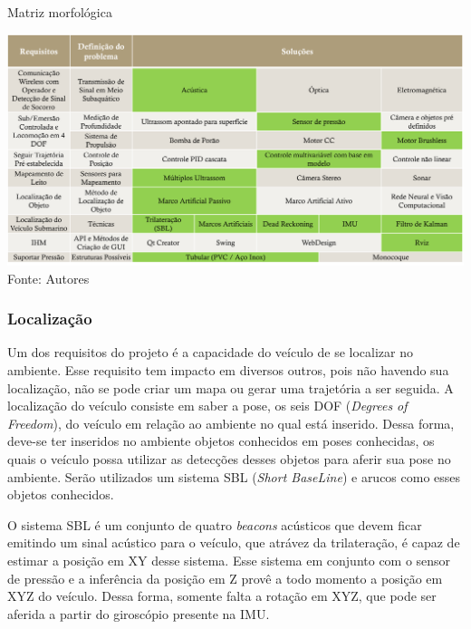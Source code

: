 \begin{table}[h]
	\centering
	\caption{Matriz morfológica}
	\label{tab:matriz-morfologica}
	\includegraphics[width=1\linewidth]{images/Matriz-morfologica}\\
	\footnotesize Fonte: Autores
\end{table}

\subsubsection*{Localização}
\label{subsec:localizacao}

Um dos requisitos do projeto é a capacidade do veículo de se localizar no ambiente. Esse requisito tem impacto em diversos outros, pois não havendo sua localização, não se pode criar um mapa ou gerar uma trajetória a ser seguida. A localização do veículo consiste em saber a pose, os seis DOF (\textit{Degrees of Freedom}), do veículo em relação ao ambiente no qual está inserido. Dessa forma, deve-se ter inseridos no ambiente objetos conhecidos em poses conhecidas, os quais o veículo possa utilizar as detecções desses objetos para aferir sua pose no ambiente. Serão utilizados um sistema SBL (\textit{Short BaseLine}) e arucos como esses objetos conhecidos.

O sistema SBL é um conjunto de quatro \textit{beacons} acústicos que devem ficar emitindo um sinal acústico para o veículo, que atrávez da trilateração, é capaz de estimar a posição em XY desse sistema. Esse sistema em conjunto com o sensor de pressão e a inferência da posição em Z provê a todo momento a posição em XYZ do veículo. Dessa forma, somente falta a rotação em XYZ, que pode ser aferida a partir do giroscópio presente na IMU.

